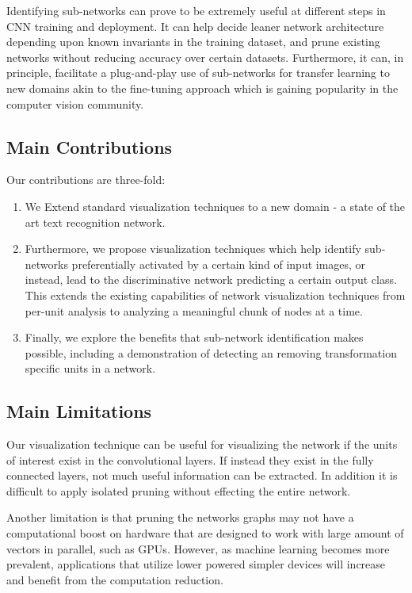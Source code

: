 \documentclass[10pt,twocolumn,letterpaper]{article}
\begin{document}
Identifying sub-networks can prove to be extremely useful at different steps in CNN training and deployment. It can help decide leaner network architecture depending upon known invariants in the training dataset, and prune existing networks without reducing accuracy over certain datasets. Furthermore, it can, in principle, facilitate a plug-and-play use of sub-networks for transfer learning to new domains akin to the fine-tuning approach which is gaining popularity in the computer vision community. \cite{}

\subsection{Main Contributions}
Our contributions are three-fold:
\begin{enumerate}
\item We Extend standard visualization techniques to a new domain - a state of the art text recognition network.

\item Furthermore, we propose visualization techniques which help identify sub-networks preferentially activated by a certain kind of input images, or instead, lead to the discriminative network predicting a certain output class. This extends the existing capabilities of network visualization techniques from per-unit analysis to analyzing a meaningful chunk of nodes at a time. 
\item \color{red} Finally, we explore the benefits that sub-network identification makes possible, including a demonstration of detecting an removing transformation specific units in a network.
\end{enumerate}

\subsection{Main Limitations}
Our visualization technique can be useful for visualizing the network if the units of interest exist in the convolutional layers. If instead they exist in the fully connected layers, not much useful information can be extracted. In addition it is difficult to apply isolated pruning without effecting the entire network.

Another limitation is that pruning the networks graphs may not have a computational boost on hardware that are designed to work with large amount of vectors in parallel, such as GPUs. However, as machine learning becomes more prevalent, applications that utilize lower powered simpler devices will increase and benefit from the computation reduction.
\end{document}
